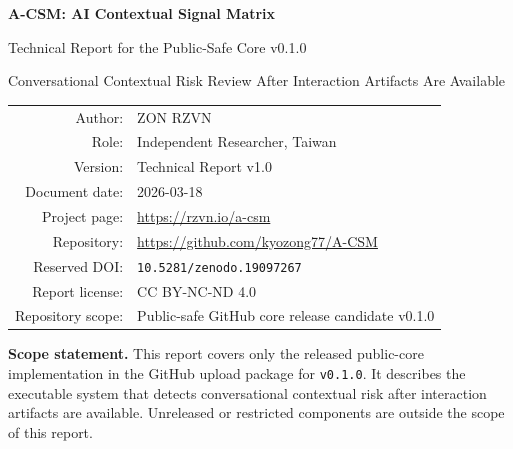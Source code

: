 \documentclass[11pt,a4paper]{article}
\begin{document}
\begin{titlepage}
\centering
{\Large \textbf{A-CSM: AI Contextual Signal Matrix}\par}
\vspace{0.8em}
{\large Technical Report for the Public-Safe Core v0.1.0\par}
\vspace{0.5em}
{\normalsize Conversational Contextual Risk Review After Interaction Artifacts Are Available\par}
\vspace{2em}

\begin{tabular}{rl}
Author: & ZON RZVN \\
Role: & Independent Researcher, Taiwan \\
Version: & Technical Report v1.0 \\
Document date: & 2026-03-18 \\
Project page: & \url{https://rzvn.io/a-csm} \\
Repository: & \url{https://github.com/kyozong77/A-CSM} \\
Reserved DOI: & \texttt{10.5281/zenodo.19097267} \\
Report license: & CC BY-NC-ND 4.0 \\
Repository scope: & Public-safe GitHub core release candidate v0.1.0 \\
\end{tabular}

\vfill

\begin{minipage}{0.9\linewidth}
\small
\textbf{Scope statement.} This report covers only the released public-core implementation in the GitHub upload package for \texttt{v0.1.0}. It describes the executable system that detects conversational contextual risk after interaction artifacts are available. Unreleased or restricted components are outside the scope of this report.
\end{minipage}

\vfill
\end{titlepage}
\end{document}
